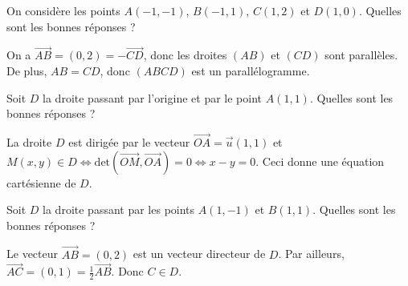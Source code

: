 \begin{question}
On considère les points $A(-1,-1)$, $B(-1,1)$, $C(1,2)$ et $D(1,0)$. Quelles sont les bonnes réponses ?
\begin{answers}  
\end{answers}
\begin{explanations}
On a $\overrightarrow{AB}=(0,2)=-\overrightarrow{CD}$, donc les droites $(AB)$ et $(CD)$ sont parallèles. De plus, $AB=CD$, donc $(ABCD)$ est un parallélogramme.
\end{explanations}
\end{question}


\begin{question}
Soit $D$ la droite passant par l'origine et par le point $A(1,1)$. Quelles sont les bonnes réponses ?
\begin{answers}  
\end{answers}
\begin{explanations}
La droite $D$ est dirigée par le vecteur $\overrightarrow{OA}=\vec{u}(1,1)$ et $M(x,y)\in D \Leftrightarrow \mbox{det}(\overrightarrow{OM},\overrightarrow{OA})=0\Leftrightarrow x-y=0$. Ceci donne une équation cartésienne de $D$.
\end{explanations}
\end{question}


\begin{question}
Soit $D$ la droite passant par les points $A(1,-1)$ et $B(1,1)$. Quelles sont les bonnes réponses ?
\begin{answers}  
\end{answers}
\begin{explanations}
Le vecteur $\overrightarrow{AB}=(0,2)$ est un vecteur directeur de $D$. Par ailleurs, $\overrightarrow{AC}=(0,1)=\frac{1}{2}\overrightarrow{AB}$. Donc $C\in D$.
\end{explanations}
\end{question}


